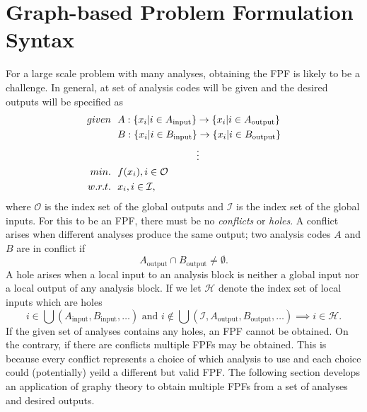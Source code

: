 \section{Graph-based Problem Formulation Syntax}
	For a large scale problem with many analyses, obtaining the FPF is likely to be a challenge. In general, at set of analysis codes will be given and the desired outputs will be specified as
	    \begin{align}
            given & \ \ A: \lbrace x_i \lvert i \in A_\textrm{input} \rbrace \rightarrow \lbrace x_i \lvert i \in A_\textrm{output} \rbrace \notag
            \\    & \ \ B: \lbrace x_i \lvert i \in B_\textrm{input} \rbrace \rightarrow \lbrace x_i \lvert i \in B_\textrm{output} \rbrace \notag
			\\    & \ \ \quad \quad \quad \quad \quad \quad  \quad \quad \vdots
            \\min. &\ \ f(x_i), i \in \mathcal{O} \notag
            \\w.r.t. & \ \ x_i, i \in \mathcal{I}, \notag
            \label{eqn:preFPF}
        \end{align}
	where $\mathcal{O}$ is the index set of the global outputs and $\mathcal{I}$ is the index set of the global inputs. For this to be an FPF, there must be no \emph{conflicts} or \emph{holes}. A conflict arises when different analyses produce the same output; two analysis codes $A$ and $B$ are in conflict if
		\begin{equation}
			A_\textrm{output} \cap B_\textrm{output} \neq \emptyset.
		\end{equation}
	A hole arises when a local input to an analysis block is neither a global input nor a local output of any analysis block. If we let $\mathcal{H}$ denote the index set of local inputs which are holes
		\begin{equation}
			i \in \bigcup (A_\textrm{input},B_\textrm{input},\ldots) \textrm{ and } i \notin \bigcup (\mathcal{I},A_\textrm{output},B_\textrm{output},\ldots)  \implies  i \in \mathcal{H}.
		\end{equation}
	If the given set of analyses contains any holes, an FPF cannot be obtained. On the contrary, if there are conflicts multiple FPFs may be obtained. This is because every conflict represents a choice of which analysis to use and each choice could (potentially) yeild a different but valid FPF. The following section develops an application of graphy theory to obtain multiple FPFs from a set of analyses and desired outputs.
		

